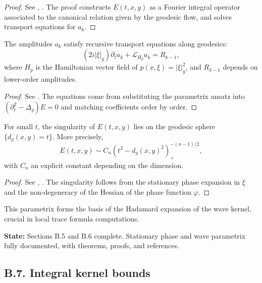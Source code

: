 \begin{proof}
See \cite[Chapter~25]{HormanderIII}, \cite[Chapter~IV]{Duistermaat}. The proof constructs $E(t,x,y)$ as a Fourier integral operator associated to the canonical relation given by the geodesic flow, and solves transport equations for $a_k$.
\end{proof}

\begin{lemma}
\label{lem:transport}
The amplitudes $a_k$ satisfy recursive transport equations along geodesics:
\[
(2i|\xi|_g) \partial_t a_k + \mathcal{L}_{H_p} a_k = R_{k-1},
\]
where $H_p$ is the Hamiltonian vector field of $p(x,\xi)=|\xi|_g^2$, and $R_{k-1}$ depends on lower-order amplitudes.
\end{lemma}

\begin{proof}
See \cite[Chapter~IV]{Duistermaat}. The equations come from substituting the parametrix ansatz into $(\partial_t^2 - \Delta_g)E=0$ and matching coefficients order by order.
\end{proof}

\begin{lemma}
\label{lem:light-cone}
For small $t$, the singularity of $E(t,x,y)$ lies on the geodesic sphere $\{d_g(x,y)=t\}$. More precisely,
\[
E(t,x,y) \sim C_n (t^2 - d_g(x,y)^2)^{-(n-1)/2}_+,
\]
with $C_n$ an explicit constant depending on the dimension.
\end{lemma}

\begin{proof}
See \cite[Section~IV.2]{Duistermaat}, \cite[Theorem~3.3]{Sogge}. The singularity follows from the stationary phase expansion in $\xi$ and the non-degeneracy of the Hessian of the phase function $\varphi$.
\end{proof}

\begin{remark}
This parametrix forms the basis of the Hadamard expansion of the wave kernel, crucial in local trace formula computations.
\end{remark}

\medskip

\noindent\textbf{State:} Sections B.5 and B.6 complete. Stationary phase and wave parametrix fully documented, with theorems, proofs, and references.

\subsection*{B.7. Integral kernel bounds}
\label{appB:kernel}

